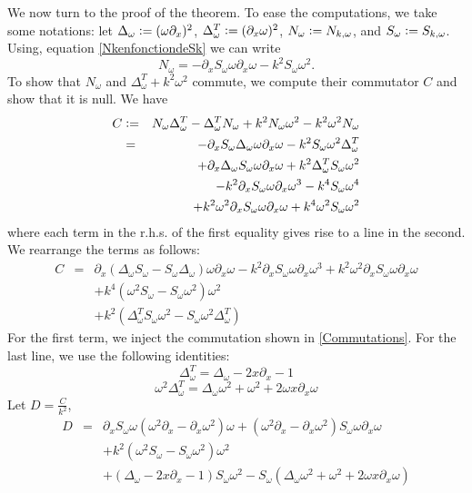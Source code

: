 \documentclass[a4paper]{article}
\begin{document}
We now turn to the proof of the theorem. To ease the computations, we take some notations: let $\Delta_\omega \mathrel{\mathop:}= (\omega \partial_x)^2$, $\Delta_\omega^T \mathrel{\mathop:}= (\partial_x \omega)^2$,  $N_\omega \mathrel{\mathop:}= N_{k,\omega}$, and $S_\omega \mathrel{\mathop:}= S_{k,\omega}$. Using, equation \eqref{NkenfonctiondeSk} we can write 
\[N_\omega = -\partial_x S_\omega \omega \partial_x \omega - k^2 S_\omega \omega^2.\]
To show that $N_\omega$ and $\Delta_\omega^T + k^2\omega^2$ commute, we compute their commutator $C$ and show that it is null. 
We have 
\begin{eqnarray*}
	C &\mathrel{\mathop:}=& N_\omega \Delta_\omega^T - \Delta_\omega^T N_\omega + k^2N_\omega \omega^2 - k^2 \omega^2 N_\omega \\
	&=& -\partial_x S_\omega \Delta_\omega \omega \partial_x \omega  - k^2 S_\omega \omega^2 \Delta_\omega^T \\
	&& + \partial_x \Delta_\omega S_\omega \omega \partial_x \omega + k^2 \Delta_\omega^T S_\omega \omega^2 \\
	&& - k^2 \partial_x S_\omega \omega \partial_x \omega^3 - k^4 S_\omega \omega^4 \\
	&& + k^2 \omega^2 \partial_x S_\omega \omega \partial_x \omega + k^4 \omega^2 S_\omega \omega^2
\end{eqnarray*}
where each term in the r.h.s. of the first equality gives rise to a line in the second. We rearrange the terms as follows:
\begin{eqnarray*}
	C &=& \partial_x (\Delta_\omega S_\omega - S_\omega \Delta_\omega) \omega \partial_x \omega - k^2 \partial_x S_\omega \omega \partial_x \omega^3 + k^2 \omega^2 \partial_x S_\omega \omega\partial_x \omega\\	
	&& + k^4 (\omega^2 S_\omega - S_\omega \omega^2) \omega^2\\
	&& + k^2(\Delta_\omega^T S_\omega \omega^2 - S_\omega \omega^2 \Delta_\omega^T)
\end{eqnarray*}
For the first term, we inject the commutation shown in \autoref{Commutations}. For the last line, we use the following identities: 
\[ \Delta_\omega^T = \Delta_\omega - 2x \partial_x - 1\]
\[ \omega^2 \Delta_\omega^T = \Delta_\omega \omega^2 + \omega^2 + 2 \omega x \partial_x \omega\]
Let $D = \frac{C}{k^2}$, 
\begin{eqnarray*}
	D &=& \partial_x S_\omega \omega (\omega^2\partial_x - \partial_x \omega^2) \omega  + (\omega^2 \partial_x - \partial_x \omega^2)S_\omega \omega \partial_x \omega\\
	&&+ k^2(\omega^2 S_\omega - S_\omega \omega^2) \omega^2\\
	&&+ (\Delta_\omega - 2x \partial_x - 1)S_\omega \omega^2 - S_\omega(\Delta_\omega \omega^2 + \omega^2 + 2\omega x \partial_x \omega) 
\end{eqnarray*}
\end{document}
